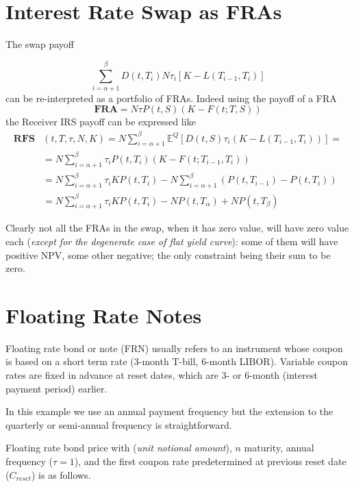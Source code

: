\documentclass[12pt,a4paper]{book}
\begin{document}
\section{Interest Rate Swap as FRAs}

The swap payoff 

\begin{equation}
	\sum_{i=\alpha+1}^{\beta} D(t,T_i)N \tau_i \left[K-L(T_{i-1},T_i)\right]
	\label{eq:payoff_payer_irs}
\end{equation}	
can be re-interpreted as a portfolio of FRAs. Indeed using the payoff of a FRA
\begin{equation}
	\textbf{FRA}= N\tau P(t,S)(K - F(t;T,S))
	\label{eq:fram_payoff_withF}
\end{equation}
the Receiver IRS payoff can be expressed like
\begin{equation}
	\begin{aligned}
		\textbf{RFS}&(t,T,\tau,N,K) = 	N\sum_{i=\alpha+1}^{\beta}\mathbb{E}^Q[D(t,S)\tau_i(K - L(T_{i-1},T_i))]=\\
		&=N\sum_{i=\alpha+1}^{\beta}\tau_i P(t,T_i)(K-F(t;T_{i-1},T_i))\\
		&=N\sum_{i=\alpha+1}^{\beta}\tau_i KP(t,T_i)-N\sum_{i=\alpha+1}^{\beta}(P(t,T_{i-1})-P(t,T_i)) \\
		&=N\sum_{i=\alpha+1}^{\beta}\tau_i KP(t,T_i)-NP(t,T_\alpha)+NP(t,T_\beta)
	\end{aligned}
\label{eq:swap_as_sum_fra}
\end{equation}

Clearly not all the FRAs in the swap, when it has zero value, will have zero value each (\emph{except for the degenerate case of flat yield curve}): some of them will have positive NPV, some other negative; the only constraint being their sum to be zero.

\section{Floating Rate Notes}
Floating rate bond or note (FRN) usually refers to an instrument whose coupon is based on a short term rate (3-month T-bill, 6-month LIBOR). Variable coupon rates are fixed in advance at reset dates, which are 3- or 6-month (interest payment period) earlier.

In this example we use an annual payment frequency but the extension to the quarterly or semi-annual frequency is straightforward.

Floating rate bond price with (\emph{unit notional amount}), $n$ maturity, annual frequency ($\tau=1$), and the first coupon rate predetermined at previous reset date ($C_{reset}$) is as follows.
\end{document}
